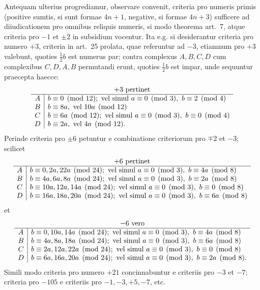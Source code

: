\documentclass[12pt]{article}
\begin{document}
Antequam ulterius progrediamur, observare convenit, criteria pro numeris primis (positive sumtis, si sunt formae $4n+1$, negative, si formae $4n+3$) sufficere ad diiudicationem pro omnibus reliquis numeris, si modo theorema art.~7, atque criteria pro $-1$ et $\pm2$ in subsidium vocentur. Ita e.g. si desiderantur criteria pro numero $+3$, criteria in art.~25 prolata, quae referuntur ad $-3$, etiamnum pro $+3$ valebunt, quoties $\frac12b$ est numerus par; contra complexus $A,B,C,D$ cum complexibus $C,D,A,B$ permutandi erunt, quoties $\frac12b$ est impar, unde sequuntur praecepta haecce:
\[
\begin{array}{c|l}
\multicolumn{2}{c}{+3\ \text{pertinet}}\\\hline
A& b\equiv0\pmod{12};\ \text{vel simul }a\equiv0\pmod3,\ b\equiv2\pmod4\\
B& b\equiv8a,\ \text{vel }10a\pmod{12}\\
C& b\equiv6a\pmod{12};\ \text{vel simul }a\equiv0\pmod3,\ b\equiv0\pmod4\\
D& b\equiv2a,\ \text{vel }4a\pmod{12}.
\end{array}
\]
Perinde criteria pro $\pm6$ petuntur e combinatione criteriorum pro $\mp2$ et $-3$; scilicet
\[
\begin{array}{c|l}
\multicolumn{2}{c}{+6\ \text{pertinet}}\\\hline
A& b\equiv0,2a,22a\pmod{24};\ \text{vel simul }a\equiv0\pmod3,\ b\equiv4a\pmod8\\
B& b\equiv4a,6a,8a\pmod{24};\ \text{vel simul }a\equiv0\pmod3,\ b\equiv2a\pmod8\\
C& b\equiv10a,12a,14a\pmod{24};\ \text{vel simul }a\equiv0\pmod3,\ b\equiv0\pmod8\\
D& b\equiv16a,18a,20a\pmod{24};\ \text{vel simul }a\equiv0\pmod3,\ b\equiv6a\pmod8
\end{array}
\]
et
\[
\begin{array}{c|l}
\multicolumn{2}{c}{-6\ \text{vero}}\\\hline
A& b\equiv0,10a,14a\pmod{24};\ \text{vel simul }a\equiv0\pmod3,\ b\equiv4a\pmod8\\
B& b\equiv4a,8a,18a\pmod{24};\ \text{vel simul }a\equiv0\pmod3,\ b\equiv6a\pmod8\\
C& b\equiv2a,12a,22a\pmod{24};\ \text{vel simul }a\equiv0\pmod3,\ b\equiv0\pmod8\\
D& b\equiv6a,16a,20a\pmod{24};\ \text{vel simul }a\equiv0\pmod3,\ b\equiv2a\pmod8.
\end{array}
\]
Simili modo criteria pro numero $+21$ concinnabuntur e criteriis pro $-3$ et $-7$; criteria pro $-105$ e criteriis pro $-1,-3,+5,-7$, etc.
\end{document}
